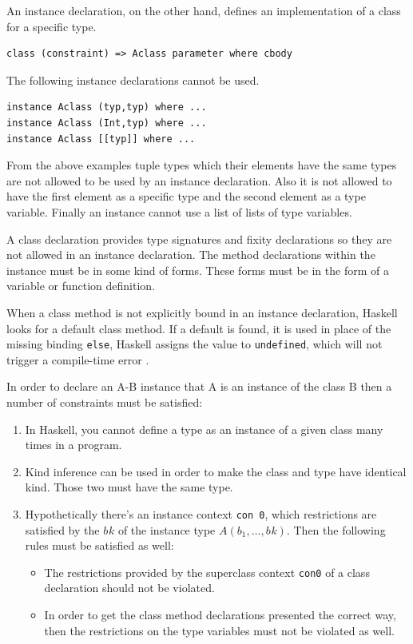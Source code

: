 \documentclass[a4paper, titlepage, twoside]{article}
\begin{document}
An instance declaration, on the other hand, defines an implementation of a class for a specific type.

\begin{verbatim}
class (constraint) => Aclass parameter where cbody
\end{verbatim}

The following instance declarations cannot be used.

\begin{verbatim}
instance Aclass (typ,typ) where ...
instance Aclass (Int,typ) where ...
instance Aclass [[typ]] where ...
\end{verbatim}

From the above examples tuple types which their elements have the same types are not allowed to be used by an instance declaration. Also it is not allowed to have the first element as a specific type and the second element as a type variable. Finally an instance cannot use a list of lists of type variables.

A class declaration provides type signatures and fixity declarations so they are not allowed in an instance declaration. The method declarations within the instance must be in some kind of forms. These forms must be in the form of a variable or function definition.

When a class method is not explicitly bound in an instance declaration, Haskell looks for a default
class method. If a default is found, it is used in place of the missing binding \texttt{else}, Haskell assigns the
value to \texttt{undefined}, which will not trigger a compile-time error \autocite{marlowHaskell2010Language2010}.

In order to declare an A-B instance that A is an instance of the class B then a number of constraints must be satisfied:

\begin{enumerate}
\item In Haskell, you cannot define a type as an instance of a given class many times in a program.

\item Kind inference can be used in order to make the class and type have identical kind. Those two must have the same type.

\item Hypothetically there’s an instance context \texttt{con 0}, which restrictions are satisfied by the \(b_{}k\) of the instance type \(A(b_1, \dots, b_{}k)\). Then the following rules must be satisfied as well:

\begin{itemize}
\item The restrictions provided by the superclass context \texttt{con0} of a class declaration should not be violated.

\item In order to get the class method declarations presented the correct way, then the restrictions on the type variables must not be violated as well.
\end{itemize}
\end{enumerate}
\end{document}
